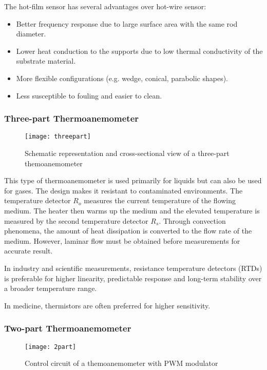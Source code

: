 The hot-film sensor has several advantages over hot-wire sensor:
\begin{itemize}
	\item Better frequency response due to large surface area with the same rod diameter.
	\item Lower heat conduction to the supports due to low thermal conductivity of the substrate material.
	\item More flexible configurations (e.g. wedge, conical, parabolic shapes).
	\item Less susceptible to fouling and easier to clean.
\end{itemize}

\subsubsection{Three-part Thermoanemometer}
\begin{figure}[ht]
	\centering
	\texttt{[image: threepart]}
	\caption{Schematic representation and cross-sectional view of a three-part themoanemometer \cite{handbook}}
	\label{3part}
\end{figure}

This type of thermoanemometer is used primarily for liquids but can also be used for gases. The design makes it resistant to contaminated environments. The temperature detector $ R_o $ measures the current temperature of the flowing medium. The heater then warms up the medium and the elevated temperature is measured by the second temperature detector $ R_s $. Through convection phenomena, the amount of heat dissipation is converted to the flow rate of the medium. However, laminar flow must be obtained before measurements for accurate result.

In industry and scientific measurements, resistance temperature detectors (RTDs) is preferable for higher linearity, predictable response and long-term stability over a broader temperature range.

In medicine, thermistors are often preferred for higher sensitivity.

\subsubsection{Two-part Thermoanemometer}

\begin{figure}[ht]
	\centering
	\texttt{[image: 2part]}
	\caption{Control circuit of a themoanemometer with PWM modulator \cite{handbook}}
	\label{2part}
\end{figure}

